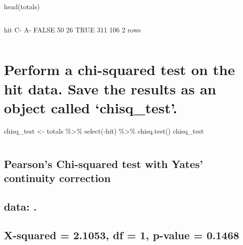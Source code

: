 \documentclass[
]{article}
\begin{document}
head(totals)

\begin{verbatim}
\end{verbatim}

hit C- A- FALSE 50 26 TRUE 311 106 2 rows

\begin{verbatim}
\end{verbatim}

\hypertarget{perform-a-chi-squared-test-on-the-hit-data.-save-the-results-as-an-object-called-chisq_test.}{%
\section{Perform a chi-squared test on the hit data. Save the results as
an object called
`chisq\_test'.}\label{perform-a-chi-squared-test-on-the-hit-data.-save-the-results-as-an-object-called-chisq_test.}}

chisq\_test \textless- totals \%\textgreater\% select(-hit)
\%\textgreater\% chisq.test() chisq\_test

\begin{verbatim}
\end{verbatim}

\hypertarget{section-6}{%
\subsection{}\label{section-6}}

\hypertarget{pearsons-chi-squared-test-with-yates-continuity-correction}{%
\subsection{Pearson's Chi-squared test with Yates' continuity
correction}\label{pearsons-chi-squared-test-with-yates-continuity-correction}}

\hypertarget{section-7}{%
\subsection{}\label{section-7}}

\hypertarget{data-.}{%
\subsection{data: .}\label{data-.}}

\hypertarget{x-squared-2.1053-df-1-p-value-0.1468}{%
\subsection{X-squared = 2.1053, df = 1, p-value =
0.1468}\label{x-squared-2.1053-df-1-p-value-0.1468}}
\end{document}
